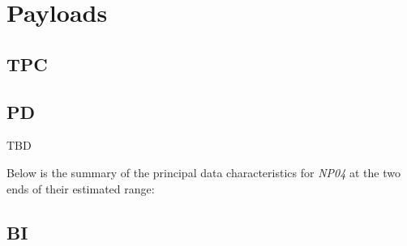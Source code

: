 \documentclass[pdftex,12pt,letter]{article}
\newcommand{\expname}{\textit{NP04}\xspace}
\begin{document}
\section{Payloads}
\subsection{TPC}
\label{sec:tpc_payloads}


\subsection{PD}
TBD

\noindent Below is the summary of the principal data characteristics for \expname at the two ends of their estimated range:


\subsection{BI}
\label{sec:bi_payloads}




\end{document}
